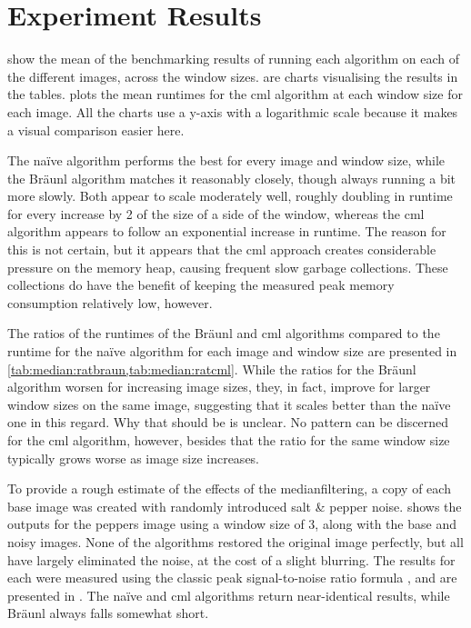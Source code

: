 \section{Experiment Results}

 show the mean of the benchmarking results of running each algorithm on each of the different images, across the window sizes.   are charts visualising the results in the tables.   plots the mean runtimes for the \gls{cml} algorithm at each window size for each image.  All the charts use a y-axis with a logarithmic scale because it makes a visual comparison easier here.

The naïve algorithm performs the best for every image and window size, while the Bräunl algorithm matches it reasonably closely, though always running a bit more slowly.  Both appear to scale moderately well, roughly doubling in runtime for every increase by 2 of the size of a side of the window, whereas the \gls{cml} algorithm appears to follow an exponential increase in runtime.  The reason for this is not certain, but it appears that the \gls{cml} approach creates considerable pressure on the memory heap, causing frequent slow garbage collections.  These collections do have the benefit of keeping the measured peak memory consumption relatively low, however.

The ratios of the runtimes of the Bräunl and \gls{cml} algorithms compared to the runtime for the naïve algorithm for each image and window size are presented in \cref{tab:median:ratbraun,tab:median:ratcml}.  While the ratios for the Bräunl algorithm worsen for increasing image sizes, they, in fact, improve for larger window sizes on the same image, suggesting that it scales better than the naïve one in this regard.  Why that should be is unclear.  No pattern can be discerned for the \gls{cml} algorithm, however, besides that the ratio for the same window size typically grows worse as image size increases.

To provide a rough estimate of the effects of the \gls{medianfilter}ing, a copy of each base image was created with randomly introduced salt \& pepper noise.   shows the outputs for the peppers image using a window size of 3, along with the base and noisy images.  None of the algorithms restored the original image perfectly, but all have largely eliminated the noise, at the cost of a slight blurring.  The results for each were measured using the classic peak signal-to-noise ratio formula \cite{Boncelet2005}, and are presented in .  The naïve and \gls{cml} algorithms return near-identical results, while Bräunl always falls somewhat short.

